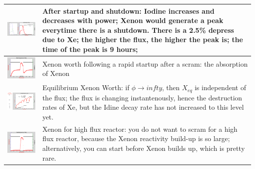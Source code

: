 \documentclass{school-22.211-notes}
\begin{document}
\begin{table}
  \centering
  \begin{tabular}{|p{3in}|p{3in}|}\hline
    \includegraphics[width=3in]{images/dfs/I-Xe-1.png} & After startup and shutdown: Iodine increases and decreases with power; Xenon would generate a peak everytime there is a shutdown. There is a 2.5\% depress due to Xe; the higher the flux, the higher the peak is; the time of the peak is 9 hours; \\ \hline
    \includegraphics[width=3in]{images/dfs/I-Xe-2.png} & Xenon worth following a rapid startup after a scram: the absorption of Xenon  \\ \hline
    \includegraphics[width=3in]{images/dfs/I-Xe-3.png} &  Equilibrium Xenon Worth: if $\phi \to infty$, then $X_{eq}$ is independent of the flux; the flux is changing instantenously, hence the destruction rates of Xe, but the Idine decay rate has not increased to this level yet. \\ \hline
    \includegraphics[width=3in]{images/dfs/I-Xe-4.png} &  Xenon for high flux reactor: you do not want to scram for a high flux reactor, because the Xenon reactivity build-up is so large; alternatively, you can start before Xenon builds up, which is pretty rare. \\ \hline

\end{tabular}
\end{table}
\end{document}

